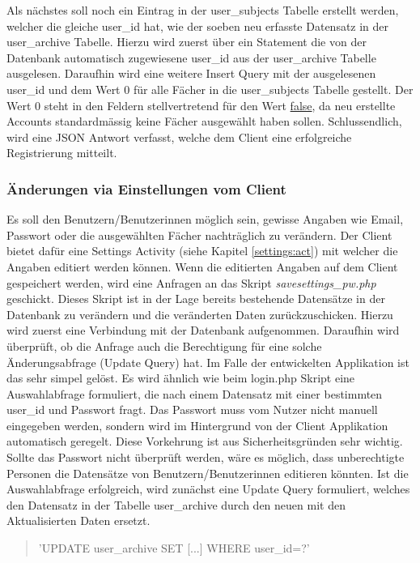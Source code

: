 \documentclass[a4paper,11pt]{report}
\begin{document}
					Als nächstes soll noch ein Eintrag in der user\_subjects Tabelle erstellt werden, welcher die gleiche user\_id hat, wie der soeben neu erfasste Datensatz in der user\_archive Tabelle. Hierzu wird zuerst über ein Statement die von der Datenbank automatisch zugewiesene user\_id aus der user\_archive Tabelle ausgelesen. Daraufhin wird eine weitere Insert Query mit der ausgelesenen user\_id und dem Wert 0 für alle Fächer in die user\_subjects Tabelle gestellt. Der Wert 0 steht in den Feldern stellvertretend für den Wert \url{false}, da neu erstellte Accounts standardmässig keine Fächer ausgewählt haben sollen. Schlussendlich, wird eine JSON Antwort verfasst, welche dem Client eine erfolgreiche Registrierung mitteilt.
					
					
					\subsubsection{Änderungen via Einstellungen vom Client}
					Es soll den Benutzern/Benutzerinnen möglich sein, gewisse Angaben wie Email, Passwort oder die ausgewählten Fächer nachträglich zu verändern. Der Client bietet dafür eine Settings Activity (siehe Kapitel \ref{settings:act}) mit welcher die Angaben editiert werden können. Wenn die editierten Angaben auf dem Client gespeichert werden, wird eine Anfragen an das Skript \emph{savesettings\_pw.php} geschickt. Dieses Skript ist in der Lage bereits bestehende Datensätze in der Datenbank zu verändern und die veränderten Daten zurückzuschicken. Hierzu wird zuerst eine Verbindung mit der Datenbank aufgenommen. Daraufhin wird überprüft, ob die Anfrage auch die Berechtigung für eine solche Änderungsabfrage (Update Query) hat. Im Falle der entwickelten Applikation ist das sehr simpel gelöst. Es wird ähnlich wie beim login.php Skript eine Auswahlabfrage formuliert, die nach einem Datensatz mit einer bestimmten user\_id und Passwort fragt. Das Passwort muss vom Nutzer nicht manuell eingegeben werden, sondern wird im Hintergrund von der Client Applikation automatisch geregelt. Diese Vorkehrung ist aus Sicherheitsgründen sehr wichtig. Sollte das Passwort nicht überprüft werden, wäre es möglich, dass unberechtigte Personen die Datensätze von Benutzern/Benutzerinnen editieren könnten. Ist die Auswahlabfrage erfolgreich, wird zunächst eine Update Query formuliert, welches den Datensatz in der Tabelle user\_archive durch den neuen mit den Aktualisierten Daten ersetzt.
					\begin{quotation}
						{\selectfont\noindent 'UPDATE user\_archive SET [...] WHERE user\_id=?'}
					\end{quotation}
					
\end{document}
